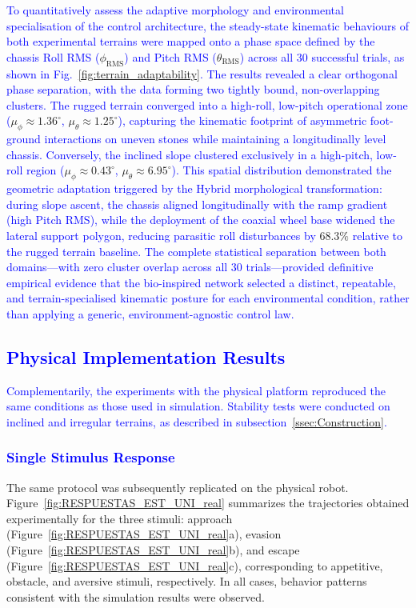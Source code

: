 \documentclass[preprint,12pt]{elsarticle}
\newcommand{\revblue}[1]{\textcolor{blue}{#1}}
\begin{document}
\revblue{To quantitatively assess the adaptive morphology and environmental specialisation of the control architecture, the steady-state kinematic behaviours of both experimental terrains were mapped onto a phase space defined by the chassis Roll RMS (}$\phi_{\text{RMS}}$\revblue{) and Pitch RMS (}$\theta_{\text{RMS}}$\revblue{) across all 30 successful trials, as shown in Fig.}~\ref{fig:terrain_adaptability}\revblue{. The results revealed a clear orthogonal phase separation, with the data forming two tightly bound, non-overlapping clusters. The rugged terrain converged into a high-roll, low-pitch operational zone (}$\mu_{\phi} \approx 1.36^{\circ}$\revblue{,} $\mu_{\theta} \approx 1.25^{\circ}$\revblue{), capturing the kinematic footprint of asymmetric foot-ground interactions on uneven stones while maintaining a longitudinally level chassis. Conversely, the inclined slope clustered exclusively in a high-pitch, low-roll region (}$\mu_{\phi} \approx 0.43^{\circ}$\revblue{,} $\mu_{\theta} \approx 6.95^{\circ}$\revblue{). This spatial distribution demonstrated the geometric adaptation triggered by the Hybrid morphological transformation: during slope ascent, the chassis aligned longitudinally with the ramp gradient (high Pitch RMS), while the deployment of the coaxial wheel base widened the lateral support polygon, reducing parasitic roll disturbances by} $68.3\%$ \revblue{relative to the rugged terrain baseline. The complete statistical separation between both domains---with zero cluster overlap across all 30 trials---provided definitive empirical evidence that the bio-inspired network selected a distinct, repeatable, and terrain-specialised kinematic posture for each environmental condition, rather than applying a generic, environment-agnostic control law.}

\subsection{\revblue{Physical Implementation Results}}

\revblue{Complementarily, the experiments with the physical platform reproduced the same conditions as those used in simulation. Stability tests were conducted on inclined and irregular terrains, as described in subsection~\ref{ssec:Construction}.} 

\subsubsection{\revblue{Single Stimulus Response}}
The same protocol was subsequently replicated on the physical robot. Figure~\ref{fig:RESPUESTAS_EST_UNI_real} summarizes the trajectories obtained experimentally for the three stimuli: approach (Figure~\ref{fig:RESPUESTAS_EST_UNI_real}a), evasion (Figure~\ref{fig:RESPUESTAS_EST_UNI_real}b), and escape (Figure~\ref{fig:RESPUESTAS_EST_UNI_real}c), corresponding to appetitive, obstacle, and aversive stimuli, respectively. In all cases, behavior patterns consistent with the simulation results were observed. 
\end{document}

